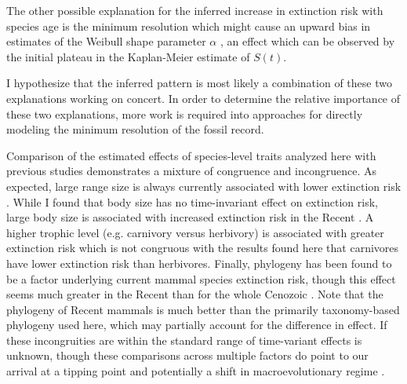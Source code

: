 \documentclass[12pt]{article}
\begin{document}
The other possible explanation for the inferred increase in extinction risk with species age is the minimum resolution which might cause an upward bias in estimates of the Weibull shape parameter \(\alpha\) \cite{Sepkoski1975}, an effect which can be observed by the initial plateau in the Kaplan-Meier estimate of $S(t)$. 

I hypothesize that the inferred pattern is most likely a combination of these two explanations working on concert. In order to determine the relative importance of these two explanations, more work is required into approaches for directly modeling the minimum resolution of the fossil record.


Comparison of the estimated effects of species-level traits analyzed here with previous studies demonstrates a mixture of congruence and incongruence. As expected, large range size is always currently associated with lower extinction risk \cite{Fritz2009,Fritz2010b,Liow2009,Purvis2000a}. While I found that body size has no time-invariant effect on extinction risk, large body size is associated with increased extinction risk in the Recent \cite{Liow2009,Fritz2009,Purvis2000a}. A higher trophic level (e.g. carnivory versus herbivory) is associated with greater extinction risk \cite{Purvis2000a} which is not congruous with the results found here that carnivores have lower extinction risk than herbivores. Finally, phylogeny has been found to be a factor underlying current mammal species extinction risk, though this effect seems much greater in the Recent than for the whole Cenozoic \cite{Fritz2010b}. Note that the phylogeny of Recent mammals is much better than the primarily taxonomy-based phylogeny used here, which may partially account for the difference in effect. If these incongruities are within the standard range of time-variant effects is unknown, though these comparisons across multiple factors do point to our arrival at a tipping point \cite{Barnosky2012a,Barnosky2011} and potentially a shift in macroevolutionary regime \cite{Jablonski1986}.

\end{document}
